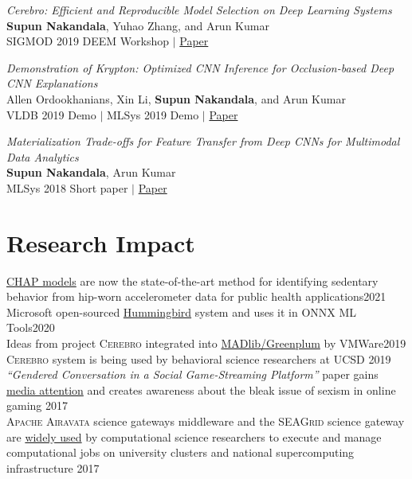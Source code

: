 \documentclass[margin]{res}
\begin{document}
\begin{resume}
\par
\textit{Cerebro: Efficient and Reproducible Model Selection on Deep Learning Systems} \\
\textbf{Supun Nakandala}, Yuhao Zhang, and Arun Kumar\\
SIGMOD 2019 DEEM Workshop $|$ \href{https://adalabucsd.github.io/papers/2019_Cerebro_DEEM.pdf}{Paper}

\par
\textit{Demonstration of Krypton: Optimized CNN Inference for Occlusion-based Deep CNN Explanations} \\
Allen Ordookhanians, Xin Li, \textbf{Supun Nakandala}, and Arun Kumar\\
VLDB 2019 Demo $|$ MLSys 2019 Demo $|$ \href{http://www.vldb.org/pvldb/vol12/p1894-ordookhanians.pdf}{Paper}

\par
\textit{Materialization Trade-offs for Feature Transfer from Deep CNNs for Multimodal Data Analytics} \\
\textbf{Supun Nakandala}, Arun Kumar\\
MLSys 2018 Short paper $|$ \href{https://adalabucsd.github.io/papers/2018_Vista_SysML.pdf}{Paper}



\section{Research Impact}
\href{https://github.com/adalabucsd/DeepPostures}{CHAP models} are now the state-of-the-art method for identifying sedentary behavior from hip-worn accelerometer data for public health applications\hfill 2021\\
Microsoft open-sourced \href{https://github.com/microsoft/hummingbird}{Hummingbird} system and uses it in ONNX ML Tools\hfill 2020\\
Ideas from project \textsc{Cerebro} integrated into \href{https://tanzu.vmware.com/content/blog/model-selection-for-deep-neural-networks-on-greenplum-database}{MADlib/Greenplum} by VMWare\hfill 2019\\
\textsc{Cerebro} system is being used by behavioral science researchers at UCSD \hfill 2019\\
\textit{``Gendered Conversation in a Social Game-Streaming Platform''} paper gains \href{https://docs.google.com/document/d/12zybT3kJb1JaW3c8oSx3hdH4g21MlkHA56C5_mkY_6I/edit?usp=sharing}{media attention} and creates awareness about the bleak issue of sexism in online gaming \hfill 2017\\
\textsc{Apache Airavata} science gateways middleware and the \textsc{SEAGrid} science gateway are \href{https://seagrid.org/publications/}{widely used} by computational science researchers to execute and manage computational jobs on university clusters and national supercomputing infrastructure \hfill 2017



\end{resume}
\end{document}
